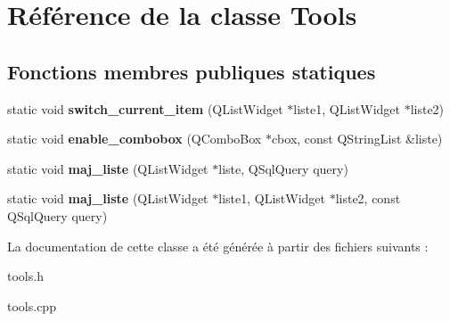 \hypertarget{class_tools}{\section{Référence de la classe Tools}
\label{class_tools}
}
\subsection*{Fonctions membres publiques statiques}
\begin{DoxyCompactItemize}
\item 
\hypertarget{class_tools_adfb1055387f11927667ad51da4b27d15}{static void {\bfseries switch\+\_\+current\+\_\+item} (Q\+List\+Widget $\ast$liste1, Q\+List\+Widget $\ast$liste2)}\label{class_tools_adfb1055387f11927667ad51da4b27d15}

\item 
\hypertarget{class_tools_adf2cfb0fe617825329e1a2c0082907e1}{static void {\bfseries enable\+\_\+combobox} (Q\+Combo\+Box $\ast$cbox, const Q\+String\+List \&liste)}\label{class_tools_adf2cfb0fe617825329e1a2c0082907e1}

\item 
\hypertarget{class_tools_a29902dd7872d4caf4ddd66435a3d335e}{static void {\bfseries maj\+\_\+liste} (Q\+List\+Widget $\ast$liste, Q\+Sql\+Query query)}\label{class_tools_a29902dd7872d4caf4ddd66435a3d335e}

\item 
\hypertarget{class_tools_aabd50fe50551005f43421a936643f748}{static void {\bfseries maj\+\_\+liste} (Q\+List\+Widget $\ast$liste1, Q\+List\+Widget $\ast$liste2, const Q\+Sql\+Query query)}\label{class_tools_aabd50fe50551005f43421a936643f748}

\end{DoxyCompactItemize}


La documentation de cette classe a été générée à partir des fichiers suivants \+:\begin{DoxyCompactItemize}
\item 
tools.\+h\item 
tools.\+cpp\end{DoxyCompactItemize}
